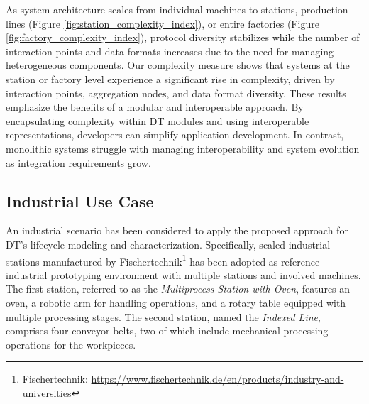 As system architecture scales from individual machines to stations, production lines (Figure \ref{fig:station_complexity_index}), or entire factories (Figure \ref{fig:factory_complexity_index}), protocol diversity stabilizes while the number of interaction points and data formats increases due to the need for managing heterogeneous components.
Our complexity measure shows that systems at the station or factory level experience a significant rise in complexity, driven by interaction points, aggregation nodes, and data format diversity.
These results emphasize the benefits of a modular and interoperable approach.
By encapsulating complexity within DT modules and using interoperable representations, developers can simplify application development.
In contrast, monolithic systems struggle with managing interoperability and system evolution as integration requirements grow.


\subsection{Industrial Use Case}
\label{sec:industrial_use_case}

An industrial scenario has been considered to apply the proposed approach for DT's lifecycle modeling and characterization. Specifically, scaled industrial stations manufactured by Fischertechnik\footnote{Fischertechnik: \url{https://www.fischertechnik.de/en/products/industry-and-universities}} has been adopted as reference industrial prototyping environment with multiple stations and involved machines. The first station, referred to as the \textit{Multiprocess Station with Oven}, features an oven, a robotic arm for handling operations, and a rotary table equipped with multiple processing stages. The second station, named the \textit{Indexed Line}, comprises four conveyor belts, two of which include mechanical processing operations for the workpieces.

